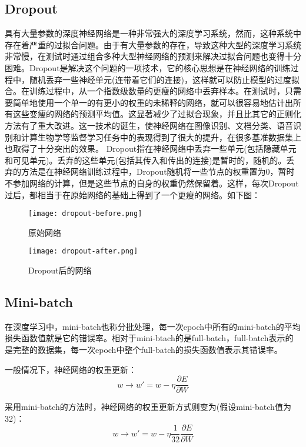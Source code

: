 \subsection{Dropout}
具有大量参数的深度神经网络是一种非常强大的深度学习系统，然而，这种系统中存在着严重的过拟合问题。由于有大量参数的存在，导致这种大型的深度学习系统非常慢，在测试时通过组合多种大型神经网络的预测来解决过拟合问题也变得十分困难。Dropout是解决这个问题的一项技术，它的核心思想是在神经网络的训练过程中，随机丢弃一些神经单元(连带着它们的连接)，这样就可以防止模型的过度拟合。在训练过程中，从一个指数级数量的更瘦的网络中丢弃样本。在测试时，只需要简单地使用一个单一的有更小的权重的未稀释的网络，就可以很容易地估计出所有这些变瘦的网络的预测平均值。这显著减少了过拟合现象，并且比其它的正则化方法有了重大改进。这一技术的诞生，使神经网络在图像识别、文档分类、语音识别和计算生物学等监督学习任务中的表现得到了很大的提升，在很多基准数据集上也取得了十分突出的效果。
Dropout指在神经网络中丢弃一些单元(包括隐藏单元和可见单元)。丢弃的这些单元(包括其传入和传出的连接)是暂时的，随机的。丢弃的方法是在神经网络训练过程中，Dropout随机将一些节点的权重置为0，暂时不参加网络的计算，但是这些节点的自身的权重仍然保留着。这样，每次Dropout过后，都相当于在原始网络的基础上得到了一个更瘦的网络。如下图：
\begin{figure}[H]
    \centering
    \texttt{[image: dropout-before.png]}
    \caption{原始网络}
    \label{fig:dropout-before}
\end{figure}
\begin{figure}[H]
    \centering
    \texttt{[image: dropout-after.png]}
    \caption{Dropout后的网络}
    \label{fig:dropout-after}
\end{figure}

\subsection{Mini-batch}

在深度学习中，mini-batch也称分批处理，每一次epoch中所有的mini-batch的平均损失函数值就是它的错误率。相对于mini-btach的是full-batch，full-batch表示的是完整的数据集，每一次epoch中整个full-batch的损失函数值表示其错误率。

一般情况下，神经网络的权重更新：
\begin{equation}
    w \rightarrow {w}' = w - \eta \frac{\partial E}{\partial W}
\end{equation}

采用mini-batch的方法时，神经网络的权重更新方式则变为(假设mini-batch值为32)：
\begin{equation}
    w \rightarrow {w}' = w - \eta \frac{1}{32} \frac{\partial E}{\partial W}
\end{equation}

